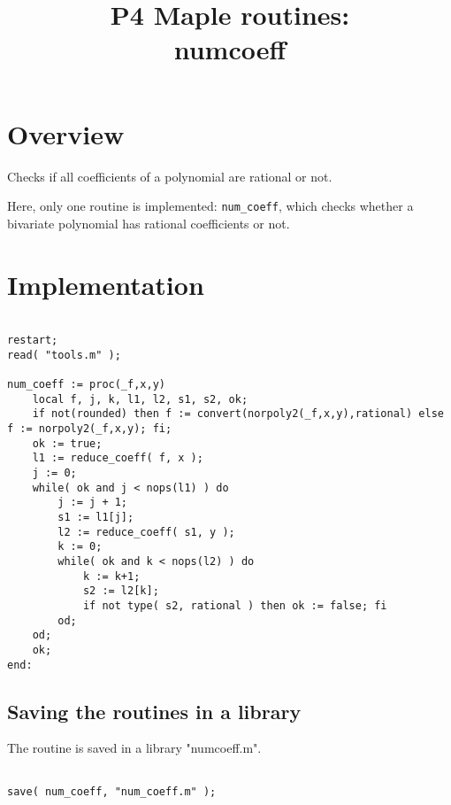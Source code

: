 \documentclass[a4paper,10pt]{article}
\title{P4 Maple routines:\\numcoeff}
\author{}
\date{}
\begin{document}
\maketitle

\section{Overview}

Checks if all coefficients of a polynomial are rational or not.

Here, only one routine is implemented: \verb+num_coeff+, which checks whether a bivariate polynomial
has rational coefficients or not.

\section{Implementation}

\begin{lstlisting}[name=numcoeff]

restart;
read( "tools.m" );

num_coeff := proc(_f,x,y)
    local f, j, k, l1, l2, s1, s2, ok;
    if not(rounded) then f := convert(norpoly2(_f,x,y),rational) else f := norpoly2(_f,x,y); fi;
    ok := true;
    l1 := reduce_coeff( f, x );
    j := 0;
    while( ok and j < nops(l1) ) do
        j := j + 1;
        s1 := l1[j];
        l2 := reduce_coeff( s1, y );
        k := 0;
        while( ok and k < nops(l2) ) do
            k := k+1;
            s2 := l2[k];
            if not type( s2, rational ) then ok := false; fi
        od;
    od;
    ok;
end:

\end{lstlisting}


\subsection{Saving the routines in a library}

The routine is saved in a library "numcoeff.m".

\begin{lstlisting}[name=gcd]

save( num_coeff, "num_coeff.m" );

\end{lstlisting}
\end{document}
